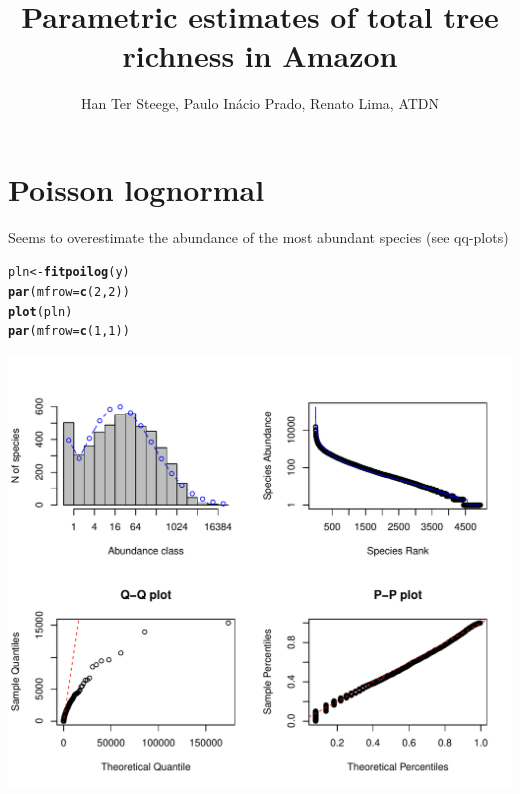 \documentclass[12pt, A4]{article}\usepackage[]{graphicx}\usepackage[]{color}
\title{Parametric estimates of total tree richness in Amazon}
\author{Han Ter Steege, Paulo Inácio Prado, Renato Lima, ATDN}
\makeatletter
\def\maxwidth{ %
  \ifdim\Gin@nat@width>\linewidth
    \linewidth
  \else
    \Gin@nat@width
  \fi
}
\newcommand{\hlnum}[1]{\textcolor[rgb]{0.686,0.059,0.569}{#1}}%
\newcommand{\hlstd}[1]{\textcolor[rgb]{0.345,0.345,0.345}{#1}}%
\newcommand{\hlkwb}[1]{\textcolor[rgb]{0.69,0.353,0.396}{#1}}%
\newcommand{\hlkwc}[1]{\textcolor[rgb]{0.333,0.667,0.333}{#1}}%
\newcommand{\hlkwd}[1]{\textcolor[rgb]{0.737,0.353,0.396}{\textbf{#1}}}%
\newenvironment{kframe}{%
 \def\at@end@of@kframe{}%
 \ifinner\ifhmode%
  \def\at@end@of@kframe{\end{minipage}}%
  \begin{minipage}{\columnwidth}%
 \fi\fi%
 \def\FrameCommand##1{\hskip\@totalleftmargin \hskip-\fboxsep
 \colorbox{shadecolor}{##1}\hskip-\fboxsep
     \hskip-\linewidth \hskip-\@totalleftmargin \hskip\columnwidth}%
 \MakeFramed {\advance\hsize-\width
   \@totalleftmargin\z@ \linewidth\hsize
   \@setminipage}}%
 {\par\unskip\endMakeFramed%
 \at@end@of@kframe}
\newenvironment{knitrout}{}{} %
\makeatother
\begin{document}
\maketitle





\section*{Poisson lognormal}

Seems to overestimate the abundance of the most abundant species (see qq-plots)
 
\begin{knitrout}
\color{fgcolor}\begin{kframe}
\begin{alltt}
\hlstd{pln} \hlkwb{<-} \hlkwd{fitpoilog}\hlstd{(y)}
\hlkwd{par}\hlstd{(}\hlkwc{mfrow}\hlstd{=}\hlkwd{c}\hlstd{(}\hlnum{2}\hlstd{,}\hlnum{2}\hlstd{))}
\hlkwd{plot}\hlstd{(pln)}
\hlkwd{par}\hlstd{(}\hlkwc{mfrow}\hlstd{=}\hlkwd{c}\hlstd{(}\hlnum{1}\hlstd{,}\hlnum{1}\hlstd{))}
\end{alltt}
\end{kframe}

{\centering \includegraphics[width=\maxwidth]{figure/fit_pln-1} 

}



\end{knitrout}
\end{document}
